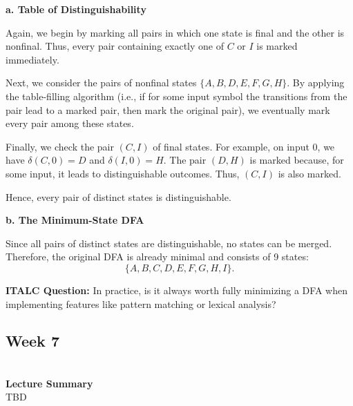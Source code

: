 \documentclass{article}
\theoremstyle{theorem}
\theoremstyle{definition}
\theoremstyle{remark}
\begin{document}
\textbf{a. Table of Distinguishability}

Again, we begin by marking all pairs in which one state is final and the other is nonfinal. Thus, every pair containing exactly one of \(C\) or \(I\) is marked immediately.

Next, we consider the pairs of nonfinal states \(\{A, B, D, E, F, G, H\}\). By applying the table-filling algorithm (i.e., if for some input symbol the transitions from the pair lead to a marked pair, then mark the original pair), we eventually mark every pair among these states.

Finally, we check the pair \((C,I)\) of final states. For example, on input 0, we have \(\delta(C,0)=D\) and \(\delta(I,0)=H\). The pair \((D,H)\) is marked because, for some input, it leads to distinguishable outcomes. Thus, \((C,I)\) is also marked.

Hence, every pair of distinct states is distinguishable.

\textbf{b. The Minimum-State DFA}

Since all pairs of distinct states are distinguishable, no states can be merged. Therefore, the original DFA is already minimal and consists of 9 states:
\[
\{A, B, C, D, E, F, G, H, I\}.
\]

\textbf{ITALC Question:}
In practice, is it always worth fully minimizing a DFA when implementing features like pattern matching or lexical analysis?


\subsection{\textbf{Week 7}}\\
\textbf{Lecture Summary}\\
TBD
\end{document}
